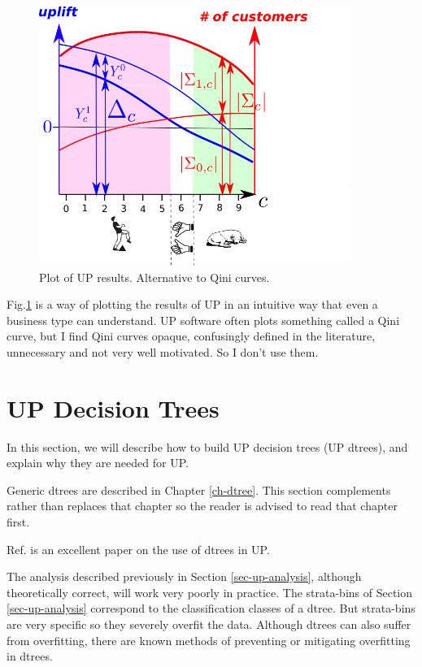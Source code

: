 \begin{figure}[h!]
\centering
\includegraphics[width=4in]
{uplift/qini-fake.png}

\caption{
Plot
of UP results.
Alternative to Qini curves.
} 
\label{fig-qini-fake}
\end{figure}
Fig.\ref{fig-qini-fake}
is a  way of
plotting
the results 
of UP in an
intuitive
way
that even a
business type can understand.
UP software
often plots something
called a Qini
curve, 
but I find Qini
curves opaque, confusingly defined 
in the literature, unnecessary
and 
not very well motivated. So I don't
use them.




\section{UP Decision Trees}

In this section,
we will describe
how to build UP decision trees (UP dtrees),
and explain why they are needed
for UP.

Generic dtrees are 
described in Chapter \ref{ch-dtree}.
This section 
complements rather than replaces
that chapter so the reader
is advised to read
that chapter first.

Ref.\cite{jaros} is an excellent paper on the use of
dtrees in UP.


The
analysis described
previously in  
Section
\ref{sec-up-analysis},
although theoretically correct,
will work very poorly in practice.
The strata-bins
of Section
\ref{sec-up-analysis}
correspond to
the classification
classes of a dtree.
But strata-bins are very
specific so they  
severely overfit the data.
Although dtrees 
can also suffer from overfitting,
there are known methods of 
preventing or mitigating overfitting in dtrees.

